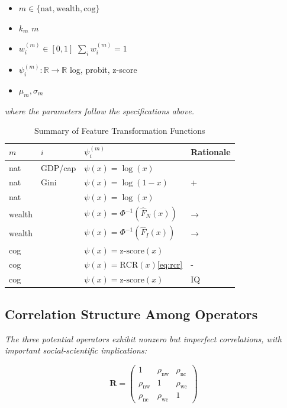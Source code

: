 \documentclass[11pt,a4paper]{article}
\theoremstyle{definition}
\newcommand{\R}{\mathbb{R}}
\begin{document}
\begin{itemize}[leftmargin=*]
    \item $m \in \{\text{nat}, \text{wealth}, \text{cog}\}$ 
    \item $k_m$  $m$ 
    \item $w_i^{(m)} \in [0,1]$ $\sum_i w_i^{(m)} = 1$
    \item $\psi_i^{(m)}: \R \to \R$ log, probit, z-score
    \item $\mu_m, \sigma_m$ 
\end{itemize}

\noindent\textit{where the parameters follow the specifications above.}

\bigskip


\begin{table}[htbp]
\centering
\caption{ Summary of Feature Transformation Functions}
\label{tab:psi-summary}
\begin{tabular}{@{}llll@{}}
\toprule
\textbf{ $m$} & \textbf{ $i$} & \textbf{ $\psi_i^{(m)}$} & \textbf{ Rationale} \\
\midrule
nat & GDP/cap & $\psi(x) = \log(x)$ &  \\
nat & Gini      & $\psi(x) = \log(1-x)$ &  +  \\
nat &   & $\psi(x) = \log(x)$ &  \\
\midrule
wealth &   & $\psi(x) = \Phi^{-1}(\hat{F}_N(x))$ & → \\
wealth &     & $\psi(x) = \Phi^{-1}(\hat{F}_I(x))$ & → \\
\midrule
cog &   & $\psi(x) = \text{z-score}(x)$ &  \\
cog &   & $\psi(x) = \text{RCR}(x)$\ref{eq:rcr} & - \\
cog &   & $\psi(x) = \text{z-score}(x)$ & IQ \\
\bottomrule
\end{tabular}
\end{table}

\subsection{ Correlation Structure Among Operators}



\medskip
\noindent\textit{The three potential operators exhibit nonzero but imperfect correlations, with important social-scientific implications:}

\begin{equation}
    \mathbf{R} = \begin{pmatrix}
        1 & \rho_{\text{nw}} & \rho_{\text{nc}} \\
        \rho_{\text{nw}} & 1 & \rho_{\text{wc}} \\
        \rho_{\text{nc}} & \rho_{\text{wc}} & 1
    \end{pmatrix}
    \label{eq:corr-matrix}
\end{equation}
\end{document}
